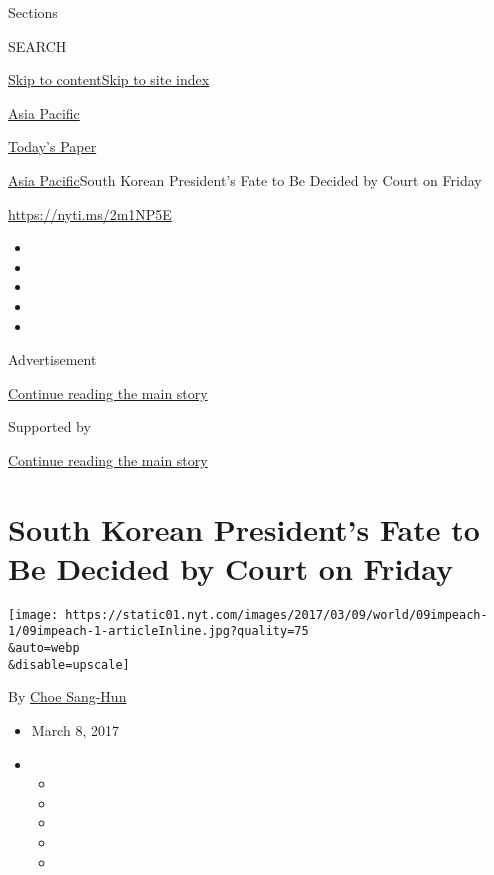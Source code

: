 Sections

SEARCH

\protect\hyperlink{site-content}{Skip to
content}\protect\hyperlink{site-index}{Skip to site index}

\href{https://www.nytimes.com/section/world/asia}{Asia Pacific}

\href{https://myaccount.nytimes.com/auth/login?response_type=cookie\&client_id=vi}{}

\href{https://www.nytimes.com/section/todayspaper}{Today's Paper}

\href{/section/world/asia}{Asia Pacific}\textbar{}South Korean
President's Fate to Be Decided by Court on Friday

\url{https://nyti.ms/2m1NP5E}

\begin{itemize}
\item
\item
\item
\item
\item
\end{itemize}

Advertisement

\protect\hyperlink{after-top}{Continue reading the main story}

Supported by

\protect\hyperlink{after-sponsor}{Continue reading the main story}

\hypertarget{south-korean-presidents-fate-to-be-decided-by-court-on-friday}{%
\section{South Korean President's Fate to Be Decided by Court on
Friday}\label{south-korean-presidents-fate-to-be-decided-by-court-on-friday}}

\texttt{[image: https://static01.nyt.com/images/2017/03/09/world/09impeach-1/09impeach-1-articleInline.jpg?quality=75\\\&auto=webp\\\&disable=upscale]}

By \href{http://www.nytimes.com/by/choe-sang-hun}{Choe Sang-Hun}

\begin{itemize}
\item
  March 8, 2017
\item
  \begin{itemize}
  \item
  \item
  \item
  \item
  \item
  \end{itemize}
\end{itemize}

